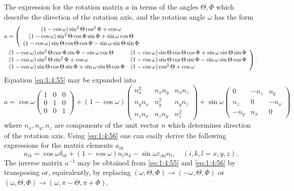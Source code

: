 The expression for the rotation matrix \(a\) in terms of the angles \(\Theta, \Phi\) which describe the direction of the rotation axis, and the rotation angle \(\omega\) has the form
\begin{align}
& a=\left(\begin{array}{cc}
(1-\cos \omega) \sin ^{2} \Theta \cos ^{2} \Phi+\cos \omega \\
(1-\cos \omega) \sin ^{2} \Theta \cos \Phi \sin \Phi+\sin \omega \cos \Theta \\
(1-\cos \omega) \sin \Theta \cos \Theta \cos \Phi-\sin \omega \sin \Theta \sin \Phi
\end{array}\right.  \notag\\
& \left.\begin{array}{ll}
(1-\cos \omega) \sin ^{2} \Theta \cos \Phi \sin \Phi-\sin \omega \cos \Theta & (1-\cos \omega) \sin \Theta \cos \Theta \cos \Phi+\sin \omega \sin \Theta \sin \Phi \\
(1-\cos \omega) \sin ^{2} \Theta \sin ^{2} \Phi+\cos \omega & (1-\cos \omega) \sin \Theta \cos \Theta \sin \Phi-\sin \omega \sin \Theta \cos \Phi \\
(1-\cos \omega) \sin \Theta \cos \Theta \sin \Phi+\sin \omega \sin \Theta \cos \Phi & (1-\cos \omega) \cos ^{2} \Theta+\cos \omega
\end{array}\right) . \label{eq:1:4:55}
\end{align}
Equation \eqref{eq:1:4:55} may be expanded into
\begin{equation}
a=\cos \omega\begin{pmatrix}
1 & 0 & 0  \label{eq:1:4:56}\\
0 & 1 & 0 \\
0 & 0 & 1
\end{pmatrix}+(1-\cos \omega)\begin{pmatrix}
n_{x}^{2} & n_{x} n_{y} & n_{x} n_{z} \\
n_{y} n_{x} & n_{y}^{2} & n_{y} n_{z} \\
n_{z} n_{x} & n_{z} n_{y} & n_{z}^{2}
\end{pmatrix}+\sin \omega\begin{pmatrix}
0 & -n_{z} & n_{y} \\
n_{z} & 0 & -n_{x} \\
-n_{y} & n_{x} & 0
\end{pmatrix}
\end{equation}
where \(n_{x}, n_{y}, n_{z}\) are components of the unit vector \(n\) which determines direction of the rotation axis. Using \eqref{eq:1:4:56} one can easily derive the following expressions for the matrix elements \(a_{i k}\)
\begin{equation}
a_{i k}=\cos \omega \delta_{i k}+(1-\cos \omega) n_{i} n_{k}-\sin \omega \varepsilon_{i k l} n_{l}, \quad(i, k, l=x, y, z) .\label{eq:1:4:57}
\end{equation}
The inverse matrix \(a^{-1}\) may be obtained from \eqref{eq:1:4:55} and \eqref{eq:1:4:56} by transposing or, equivalently, by replacing \((\omega, \Theta, \Phi) \rightarrow(-\omega, \Theta, \Phi)\) or \((\omega, \Theta, \Phi) \rightarrow (\omega, \pi-\Theta, \pi+\Phi)\).

